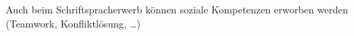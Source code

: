 Auch beim Schriftspracherwerb können soziale Kompetenzen erworben werden (Teamwork, Konfliktlösung, \ldots)
